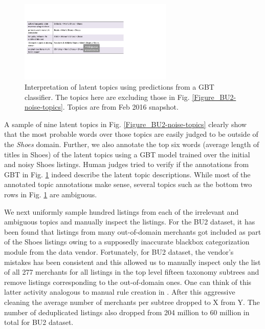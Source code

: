 \begin{figure}
	\vspace{-0.5cm}
	\centering
	\includegraphics[width=0.65\textwidth]{images/BU2-topic-annotation}
	\vspace{-0.4cm}
	\caption{\small{Interpretation of latent topics using predictions from a GBT classifier. The topics here are excluding those in Fig. \ref{Figure_BU2-noise-topics}. Topics are from Feb 2016 snapshot.}}
	\label{Figure_BU2-topic-annotation}
	\vspace{-0.3cm}
\end{figure}
A sample of nine latent topics in Fig. \ref{Figure_BU2-noise-topics} clearly show that the most probable words over those topics are easily judged to be outside of the \textit{Shoes} domain.
Further, we also annotate the top six words (average length of titles in Shoes) of the latent topics using a GBT model trained over the initial and noisy Shoes listings. 
Human judges tried to verify if the annotations from GBT in Fig. \ref{Figure_BU2-topic-annotation} indeed describe the latent topic descriptions.
While most of the annotated topic annotations make sense, several topics such as the bottom two rows in Fig. \ref{Figure_BU2-topic-annotation} are ambiguous.

We next uniformly sample hundred listings from each of the irrelevant and ambiguous topics and manually inspect the listings. 
For the BU2 dataset, it has been found that listings from many out-of-domain merchants got included as part of the Shoes listings owing to a supposedly inaccurate blackbox categorization module from the data vendor.
Fortunately, for BU2 dataset, the vendor's mistakes has been consistent and this allowed us to manually inspect only the list of all 277 merchants for all listings in the top level fifteen taxonomy subtrees and remove listings corresponding to the out-of-domain ones.
One can think of this latter activity analogous to manual rule creation in \cite{Sun14}.
After this aggressive cleaning the average number of merchants per subtree dropped to X from Y.
The number of deduplicated listings also dropped from 204 million to 60 million in total for BU2 dataset.

